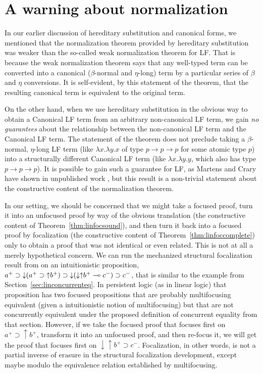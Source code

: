\section{A warning about normalization}
\label{sec:warning}

In our earlier discussion of hereditary substitution and canonical
forms, we mentioned that the normalization theorem provided by
hereditary substitution was weaker than the so-called weak
normalization theorem for LF. That is because the weak normalization
theorem says that any well-typed term can be converted into a
canonical ($\beta$-normal and $\eta$-long) term by a particular series
of $\beta$ and $\eta$ conversions. It is self-evident, by this statement
of the theorem, that the resulting canonical term is equivalent
to the original term. 

On the other hand, when we use hereditary substitution in the obvious
way to obtain a Canonical LF term from an arbitrary non-canonical LF
term, we gain {\it no guarantees} about the relationship between the
non-canonical LF term and the Canonical LF term. The statement of the
theorem does not preclude taking a $\beta$-normal, $\eta$-long LF term
(like $\lambda x. \lambda y. x$ of type $p \rightarrow p \rightarrow
p$ for some atomic type $p$) into a structurally different Canonical
LF term (like $\lambda x. \lambda y. y$, which also has type $p
\rightarrow p \rightarrow p$). It is possible to gain such a guarantee
for LF, as Martens and Crary have shown in unpublished work
\cite{martens11mechanizing}, but this result is a non-trivial statement
about the constructive content of the normalization theorem. 

In our setting, we should be concerned that we might take a focused
proof, turn it into an unfocused proof by way of the obvious
translation (the constructive content of
Theorem~\ref{thm:linfocsound}), and then turn it back into a focused
proof by focalization (the constructive content of
Theorem~\ref{thm:linfoccomplete}) only to obtain a proof that was not
identical or even related. This is not at all a merely hypothetical
concern. We can run the mechanized structural focalization result from
\cite{simmons11structural} on an intuitionistic proposition,
%
   $a^+ \supset 
   {\downarrow}(a^+ \supset {\uparrow}b^+) \supset
   {\downarrow}({\downarrow}{\uparrow}b^+ \multimap c^-) \supset
   c^-$, 
%
that is similar to the example from
Section~\ref{sec:linconcurrenteq}.  In persistent logic (as in
linear logic) that proposition has two focused propositions that
are probably multifocusing equivalent (given a intuitionistic
notion of multifocusing) but that are not concurrently equivalent
under the proposed definition of concurrent equality from that
section. However, if we take the focused proof that focuses 
first on $a^+ \supset {\uparrow}b^+$, transform it into an unfocused 
proof, and then re-focus it, we will get the proof that focuses 
first on ${\downarrow}{\uparrow}b^+ \supset c^-$. Focalization,
in other words, is not a partial inverse of erasure in the structural
focalization development, except maybe modulo the equivalence
relation established by multifocusing. 

